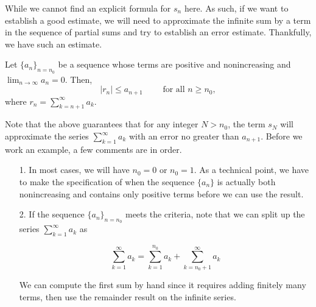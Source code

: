 \documentclass{ximera}
\begin{document}
While we cannot find an explicit formula for $s_n$ here.  As such, if we want to establish a good estimate, we will need to approximate the infinite sum by a term in the sequence of partial sums and try to establish an error estimate.  Thankfully, we have such an estimate.

\begin{theorem}
Let $\{a_n\}_{n=n_0}$ be a sequence whose terms are positive and nonincreasing  and
$\lim_{n\to\infty}a_n=0$. Then,  
\[
\big| r_n \big| \leq a_{n+1} \qquad \textrm{ for all } n \geq n_0,
\]
where $r_n = \sum_{k=n+1}^{\infty} a_k$.
\end{theorem}

Note that the above guarantees that for any integer $N>n_0$, the term $s_N$ will approximate the series $\sum_{k=1}^{\infty} a_k$ with an error no greater than $a_{n+1}$.  Before we work an example, a few comments are in order.

\begin{itemize}
\item[1.] In most cases, we will have $n_0 = 0$ or $n_0 =1$.  As a technical point, we have to make the specification of when the sequence $\{a_n\}$ is actually both nonincreasing and contains only positive terms before we can use the result.  
\item[2.] If the sequence $\{a_n\}_{n = n_0}$ meets the criteria, note that we can split up the series $\sum_{k=1}^{\infty} a_k$ as 

\[ 
\sum_{k=1}^{\infty} a_k = \sum_{k=1}^{n_0} a_k +\sum_{k=n_0+1}^{\infty} a_k 
\]

We can compute the first sum by hand since it requires adding finitely many terms, then use the remainder result on the infinite series.
\end{itemize}
\end{document}
